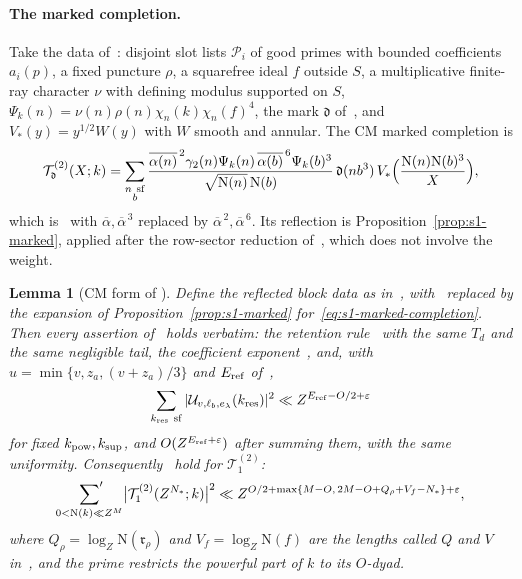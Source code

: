 \documentclass[11pt]{article}
\numberwithin{equation}{section}
\newcommand{\N}{\mathrm N}
\newtheorem{lemma}{Lemma}
\begin{document}
\paragraph{The marked completion.} Take the data of~\cite[Section~14.1]{OAI78}: disjoint slot lists $\mathcal P_i$ of
good primes with bounded coefficients $a_i(p)$, a fixed puncture $\rho$, a squarefree ideal $f$ outside $S$, a
multiplicative finite-ray character $\nu$ with defining modulus supported on $S$, $\Psi_k(n)=\nu(n)\rho(n)\chi_n(k)
\chi_n(f)^4$, the mark $\mathfrak d$ of~\cite[eq.~(14.1)]{OAI78}, and $V_*(y)=y^{1/2}W(y)$ with $W$ smooth and
annular. The CM marked completion is
\begin{equation}\label{eq:s1-marked-completion}
 \mathcal T^{(2)}_{\mathfrak d}(X;k)=\sum_{\substack{n\ {\rm sf}\\b}}
 \frac{\overline{\alpha(n)}^{\,2}\gamma_2(n)\Psi_k(n)\,\overline{\alpha(b)}^{\,6}\Psi_k(b)^3}{\sqrt{\N(n)}\,\N(b)}
 \,\mathfrak d(nb^3)\,V_*\Bigl(\frac{\N(n)\N(b)^3}X\Bigr),
\end{equation}
which is~\cite[eq.~(14.2)]{OAI78} with $\overline\alpha,\overline\alpha^{\,3}$ replaced by
$\overline\alpha^{\,2},\overline\alpha^{\,6}$. Its reflection is Proposition~\ref{prop:s1-marked}, applied after the
row-sector reduction of~\cite[Section~14.1]{OAI78}, which does not involve the weight.

\begin{lemma}[CM form of {\cite[Lemma~14.3]{OAI78}}]\label{lem:s1-reflected-energy}
Define the reflected block data as in~\cite[Section~14.4, \emph{Reflected block data}]{OAI78}, with~\cite[eq.~(14.3)]{OAI78} replaced by
the expansion of Proposition~\ref{prop:s1-marked} for~\eqref{eq:s1-marked-completion}. Then every assertion
of~\cite[Lemma~14.3]{OAI78} holds verbatim: the retention rule~\cite[eq.~(14.11)]{OAI78} with the
same $T_d$ and the same negligible tail, the coefficient exponent~\cite[eq.~(14.12)]{OAI78}, and, with
$u=\min\{v,z_a,(v+z_a)/3\}$ and $E_{\rm ref}$ of~\cite[eqs.~(14.13) and (14.14)]{OAI78},
\begin{equation}\label{eq:d142}
 \sum_{k_{\rm res}\ {\rm sf}}|\mathcal U_{v,\ell_b,e_\lambda}(k_{\rm res})|^2\ll Z^{E_{\rm ref}-O/2+\varepsilon}
\end{equation}
for fixed $k_{\rm pow},k_{\rm sup}$, and $O(Z^{E_{\rm ref}+\varepsilon})$ after summing them, with the same
uniformity. Consequently~\cite[eqs.~(14.17) and~(14.18)]{OAI78} hold for
$\mathcal T^{(2)}_1$:
\begin{equation}\label{eq:d143}
 \sideset{}{'}\sum_{0<\N(k)\ll Z^M}\bigl|\mathcal T^{(2)}_1(Z^{N_*};k)\bigr|^2\ll
 Z^{O/2+\max\{M-O,\,2M-O+Q_\rho+V_f-N_*\}+\varepsilon},
\end{equation}
where $Q_\rho=\log_Z\N(\mathfrak r_\rho)$ and $V_f=\log_Z\N(f)$ are the lengths called $Q$ and $V$
in~\cite{OAI78}, and the prime restricts the powerful part of $k$ to its $O$-dyad.
\end{lemma}
\end{document}
